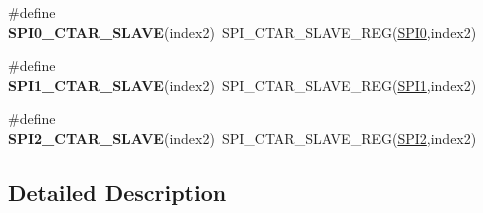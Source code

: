 \begin{DoxyCompactItemize}
\item 
\#define {\bfseries S\+P\+I0\+\_\+\+C\+T\+A\+R\+\_\+\+S\+L\+A\+VE}(index2)~S\+P\+I\+\_\+\+C\+T\+A\+R\+\_\+\+S\+L\+A\+V\+E\+\_\+\+R\+EG(\hyperlink{group__SPI__Peripheral__Access__Layer_gaf26e39c91b262cc480085abcc450d3d5}{S\+P\+I0},index2)\hypertarget{group__SPI__Register__Accessor__Macros_gab35f3bc77755e3d6e604d91d0ae4545f}{}\label{group__SPI__Register__Accessor__Macros_gab35f3bc77755e3d6e604d91d0ae4545f}

\item 
\#define {\bfseries S\+P\+I1\+\_\+\+C\+T\+A\+R\+\_\+\+S\+L\+A\+VE}(index2)~S\+P\+I\+\_\+\+C\+T\+A\+R\+\_\+\+S\+L\+A\+V\+E\+\_\+\+R\+EG(\hyperlink{group__SPI__Peripheral__Access__Layer_gad483be344a28ac800be8f03654a9612f}{S\+P\+I1},index2)\hypertarget{group__SPI__Register__Accessor__Macros_ga361579ce18b530b397c5de3ac7f0901d}{}\label{group__SPI__Register__Accessor__Macros_ga361579ce18b530b397c5de3ac7f0901d}

\item 
\#define {\bfseries S\+P\+I2\+\_\+\+C\+T\+A\+R\+\_\+\+S\+L\+A\+VE}(index2)~S\+P\+I\+\_\+\+C\+T\+A\+R\+\_\+\+S\+L\+A\+V\+E\+\_\+\+R\+EG(\hyperlink{group__SPI__Peripheral__Access__Layer_gaf2c3d8ce359dcfbb2261e07ed42af72b}{S\+P\+I2},index2)\hypertarget{group__SPI__Register__Accessor__Macros_ga22f28ca15ffb5162a59cb82e4ff460fd}{}\label{group__SPI__Register__Accessor__Macros_ga22f28ca15ffb5162a59cb82e4ff460fd}

\end{DoxyCompactItemize}


\subsection{Detailed Description}

